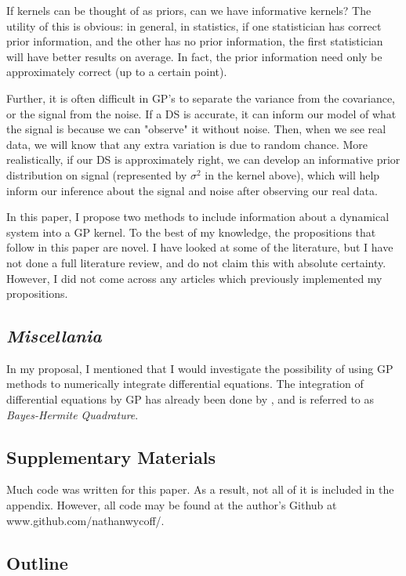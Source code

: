 \documentclass{article}
\begin{document}
	If kernels can be thought of as priors, can we have informative kernels? The utility of this is obvious: in general, in statistics, if one statistician has correct prior information, and the other has no prior information, the first statistician will have better results on average. In fact, the prior information need only be approximately correct (up to a certain point). 
	
	Further, it is often difficult in GP's to separate the variance from the covariance, or the signal from the noise. If a DS is accurate, it can inform our model of what the signal is because we can "observe" it without noise. Then, when we see real data, we will know that any extra variation is due to random chance. More realistically, if our DS is approximately right, we can develop an informative prior distribution on signal (represented by $\sigma^2$ in the kernel above), which will help inform our inference about the signal and noise after observing our real data.
	
	In this paper, I propose two methods to include information about a dynamical system into a GP kernel. To the best of my knowledge, the propositions that follow in this paper are novel. I have looked at some of the literature, but I have not done a full literature review, and do not claim this with absolute certainty. However, I did not come across any articles which previously implemented my propositions.
	
	\subsection{\textit{Miscellania}}
	
	In my proposal, I mentioned that I would investigate the possibility of using GP methods to numerically integrate differential equations. The integration of differential equations by GP has already been done by \cite{OHAGAN1991245}, and is referred to as \textit{Bayes-Hermite Quadrature}.
	
	\subsection{Supplementary Materials}
	
	Much code was written for this paper. As a result, not all of it is included in the appendix. However, all code may be found at the author's Github at www.github.com/nathanwycoff/.
	
	\subsection{Outline}
	
\end{document}

